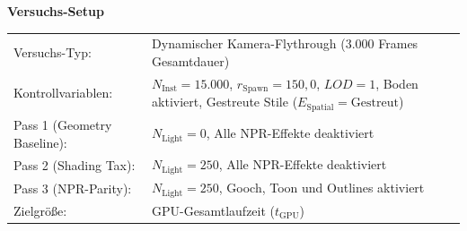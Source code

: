 \begin{center}
    \small
    \colorbox{gray!5}{\parbox{0.95\textwidth}{
        \centering
        \vspace{3mm}
        {\sffamily\bfseries\large Versuchs-Setup} \\[2ex]

        \begin{tabularx}{0.9\textwidth}{>{\sffamily}l X}
            Versuchs-Typ:       & Dynamischer Kamera-Flythrough ($3.000$ Frames Gesamtdauer) \\
            Kontrollvariablen:  & $N_{\text{Inst}} = 15.000$, $r_{\text{Spawn}} = 150{,}0$, $LOD = 1$,
            Boden aktiviert, Gestreute Stile ($E_{\text{Spatial}} = \text{Gestreut}$) \\
            \midrule
            \addlinespace
            \quad Pass 1 (Geometry Baseline): & $N_{\text{Light}} = 0$, Alle \ac{NPR}-Effekte deaktiviert \\
            \quad Pass 2 (Shading Tax):       & $N_{\text{Light}} = 250$, Alle \ac{NPR}-Effekte deaktiviert \\
            \quad Pass 3 (\ac{NPR}-Parity):   & $N_{\text{Light}} = 250$, Gooch, Toon und Outlines aktiviert \\

            \addlinespace
            \midrule
            \addlinespace

            Zielgröße:          & \ac{GPU}-Gesamtlaufzeit ($t_{\text{GPU}}$)
        \end{tabularx}
        \vspace{1mm}
    }}
\end{center}

